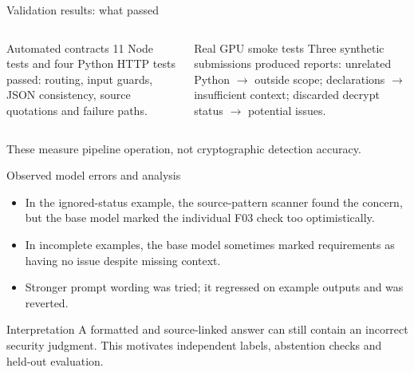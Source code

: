 \documentclass[aspectratio=169,10pt]{beamer}
\begin{document}
\begin{frame}{Validation results: what passed}
\begin{columns}[T]
\begin{block}{Automated contracts}
11 Node tests and four Python HTTP tests passed: routing, input guards, JSON consistency, source quotations and failure paths.
\end{block}
\begin{block}{Real GPU smoke tests}
Three synthetic submissions produced reports: unrelated Python \(\rightarrow\) outside scope; declarations \(\rightarrow\) insufficient context; discarded decrypt status \(\rightarrow\) potential issues.
\end{block}
\end{columns}
\vspace{0.8em}
\centering\alert{These measure pipeline operation, not cryptographic detection accuracy.}
\end{frame}

\begin{frame}{Observed model errors and analysis}
\begin{itemize}
\item In the ignored-status example, the source-pattern scanner found the concern, but the base model marked the individual F03 check too optimistically.
\item In incomplete examples, the base model sometimes marked requirements as having no issue despite missing context.
\item Stronger prompt wording was tried; it regressed on example outputs and was reverted.
\end{itemize}
\begin{alertblock}{Interpretation}
A formatted and source-linked answer can still contain an incorrect security judgment. This motivates independent labels, abstention checks and held-out evaluation.
\end{alertblock}
\end{frame}
\end{document}
